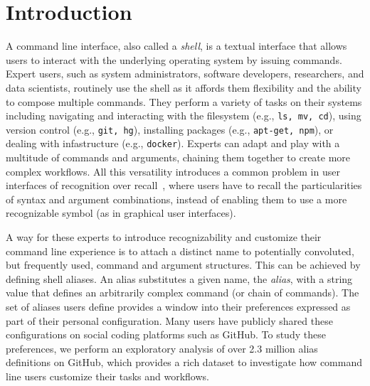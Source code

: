 \section{Introduction}

A command line interface, also called a \emph{shell}, is a textual interface that allows users to interact with the underlying operating system by issuing commands.
Expert users, such as system administrators, software developers, researchers, and data scientists, routinely use the shell as it affords them flexibility and the ability to compose multiple commands.
They perform a variety of tasks on their systems including navigating and interacting with the filesystem (e.g., \verb|ls, mv, cd|), using version control (e.g., \verb|git, hg|), installing packages (e.g., \verb|apt-get, npm|), or dealing with infastructure (e.g., \verb|docker|).
Experts can adapt and play with a multitude of commands and arguments, chaining them together to create more complex workflows.
All this versatility introduces a common problem in user interfaces of recognition over recall~\cite{nielsen:05}, where users have to recall the particularities of syntax and argument combinations, instead of enabling them to use a more recognizable symbol (as in graphical user interfaces).

A way for these experts to introduce recognizability and customize their command line experience is to attach a distinct name to potentially convoluted, but frequently used, command and argument structures.
This can be achieved by defining shell aliases.
An alias substitutes a given name, the \emph{alias}, with a string value that defines an arbitrarily complex command (or chain of commands).
The set of aliases users define provides a window into their preferences expressed as part of their personal configuration.
Many users have publicly shared these configurations on social coding platforms such as GitHub.
To study these preferences, we perform an exploratory analysis of over 2.3 million alias definitions on GitHub, which provides a rich dataset to investigate how command line users customize their tasks and workflows.

